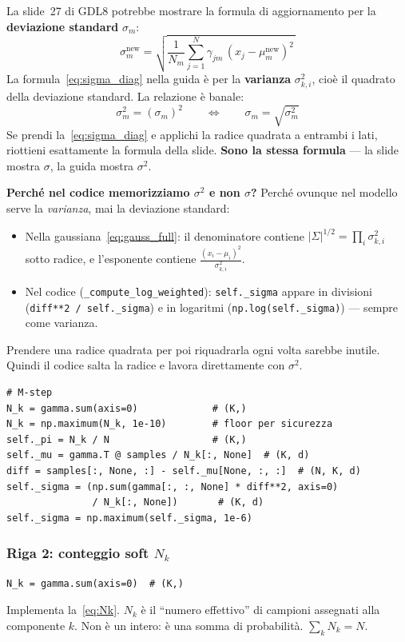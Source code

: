 \documentclass[11pt,a4paper]{article}
\begin{document}
\begin{infobox}
La slide~27 di GDL8 potrebbe mostrare la formula di aggiornamento
per la \textbf{deviazione standard} $\sigma_m$:
\[
  \sigma_m^{\text{new}}
  = \sqrt{\frac{1}{N_m}\sum_{j=1}^{N}
    \gamma_{jm}\,(x_j - \mu_m^{\text{new}})^2\,}
\]
La formula~\eqref{eq:sigma_diag} nella guida \`{e} per la
\textbf{varianza} $\sigma_{k,i}^{2}$, cio\`{e} il quadrato della
deviazione standard. La relazione \`{e} banale:
\[
  \sigma_m^2 = \left(\sigma_m\right)^2
  \qquad\Longleftrightarrow\qquad
  \sigma_m = \sqrt{\sigma_m^2}
\]
Se prendi la~\eqref{eq:sigma_diag} e applichi la radice quadrata
a entrambi i lati, riottieni esattamente la formula della slide.
\textbf{Sono la stessa formula} --- la slide mostra $\sigma$, la
guida mostra $\sigma^2$.

\medskip
\textbf{Perch\'{e} nel codice memorizziamo $\sigma^2$ e non
$\sigma$?}
Perch\'{e} ovunque nel modello serve la \emph{varianza}, mai la
deviazione standard:
\begin{itemize}[nosep]
  \item Nella gaussiana~\eqref{eq:gauss_full}: il denominatore
        contiene $|\Sigma|^{1/2} = \prod_i \sigma_{k,i}^2$
        sotto radice, e l'esponente contiene
        $\frac{(x_i-\mu_i)^2}{\sigma_{k,i}^2}$.
  \item Nel codice (\texttt{\_compute\_log\_weighted}):
        \texttt{self.\_sigma} appare in divisioni (\texttt{diff**2
        / self.\_sigma}) e in logaritmi (\texttt{np.log(self.\_sigma)})
        --- sempre come varianza.
\end{itemize}
Prendere una radice quadrata per poi riquadrarla ogni volta sarebbe
inutile. Quindi il codice salta la radice e lavora direttamente con
$\sigma^2$.
\end{infobox}

\begin{lstlisting}[caption={M-step nel codice}]
# M-step
N_k = gamma.sum(axis=0)             # (K,)
N_k = np.maximum(N_k, 1e-10)        # floor per sicurezza
self._pi = N_k / N                  # (K,)
self._mu = gamma.T @ samples / N_k[:, None]  # (K, d)
diff = samples[:, None, :] - self._mu[None, :, :]  # (N, K, d)
self._sigma = (np.sum(gamma[:, :, None] * diff**2, axis=0)
               / N_k[:, None])       # (K, d)
self._sigma = np.maximum(self._sigma, 1e-6)
\end{lstlisting}

\subsubsection{Riga 2: conteggio soft $N_k$}
\begin{lstlisting}
N_k = gamma.sum(axis=0)  # (K,)
\end{lstlisting}
Implementa la~\eqref{eq:Nk}. $N_k$ è il ``numero effettivo'' di
campioni assegnati alla componente $k$. Non è un intero: è una somma
di probabilità. $\sum_k N_k = N$.
\end{document}
